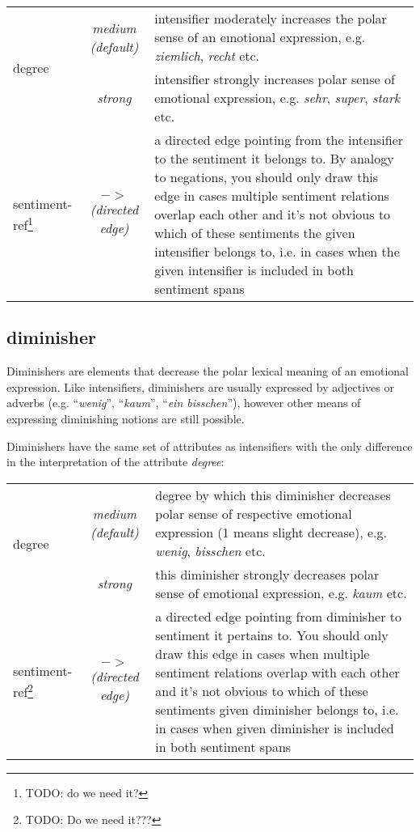 \documentclass[11pt,a4paper]{article}
\newlength\clmnwidth
\begin{document}
\begin{tabular}{|l|c|p{\clmnwidth}|}\hline
  \multirow{2}{*}{degree} & \textit{medium (default)} & intensifier
  moderately increases the polar sense of an emotional expression,
  e.g. \textit{ziemlich}, \textit{recht} etc.\\\cline{2-3}

  & \textit{strong} & intensifier strongly increases polar sense of
  emotional expression, e.g. \textit{sehr}, \textit{super},
  \textit{stark} etc.\\\hline


  sentiment-ref\footnote{TODO: do we need it?} &
  \textit{$->$\newline(directed edge)} & a directed edge pointing from
  the intensifier to the sentiment it belongs to. By analogy to
  negations, you should only draw this edge in cases multiple
  sentiment relations overlap each other and it's not obvious to which
  of these sentiments the given intensifier belongs to, i.e. in cases
  when the given intensifier is included in both sentiment
  spans\\\hline
\end{tabular}
\vspace{0.5cm}

\subsection{diminisher}
Diminishers are elements that decrease the polar lexical meaning of an
emotional expression.  Like intensifiers, diminishers are usually
expressed by adjectives or adverbs (e.g. ``\textit{wenig}'',
``\textit{kaum}'', ``\textit{ein bisschen}''), however other means of
expressing diminishing notions are still possible.

Diminishers have the same set of attributes as intensifiers with the
only difference in the interpretation of the attribute
\textit{degree}:

\begin{tabular}{|l|c|p{\clmnwidth}|}\hline
  \multirow{2}{*}{degree} & \textit{medium (default)} & degree by which
  this diminisher decreases polar sense of respective emotional
  expression (1 means slight decrease), e.g. \textit{wenig},
  \textit{bisschen} etc.\\\cline{2-3}

  & \textit{strong} & this diminisher strongly decreases polar sense
  of emotional expression, e.g. \textit{kaum} etc.\\\hline

  sentiment-ref\footnote{TODO: Do we need it???} &
  \textit{$->$\newline(directed edge)} & a directed edge pointing from
  diminisher to sentiment it pertains to. You should only draw this
  edge in cases when multiple sentiment relations overlap with each
  other and it's not obvious to which of these sentiments given
  diminisher belongs to, i.e. in cases when given diminisher is
  included in both sentiment spans\\\hline
\end{tabular}
\end{document}
